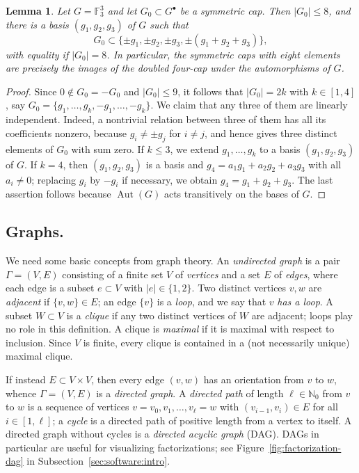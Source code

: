 \documentclass[a4paper, 10pt]{amsart}
\theoremstyle{plain}
\newtheorem{lemma}[theorem]{\bf Lemma}
\theoremstyle{definition}
\theoremstyle{definition}
\newcommand{\N}{\mathbb N}
\newcommand{\F}{\mathbb F}
\DeclareMathOperator{\Aut}{Aut} \DeclareMathOperator{\GL}{GL}
\numberwithin{equation}{section}
\begin{document}
\begin{lemma}\label{lem:symmetric-caps}
Let $G = \F_3^3$ and let $G_0 \subset G^{\bullet}$ be a symmetric cap.  Then
$|G_0| \le 8$, and there is a basis $(g_1,g_2,g_3)$ of $G$ such that
\[
 G_0 \subset \{\pm g_1, \pm g_2, \pm g_3, \pm (g_1+g_2+g_3)\} ,
\]
with equality if $|G_0| = 8$.  In particular, the symmetric caps with eight
elements are precisely the images of the doubled four-cap under the
automorphisms of $G$.
\end{lemma}

\begin{proof}
Since $0 \notin G_0 = -G_0$ and $|G_0| \le 9$, it follows  that $|G_0| = 2k$ with $k \in [1,4]$, say  $G_0=\{g_1, \ldots, g_k, -g_1, \ldots, -g_k\}$.  We claim that any three of them are
linearly independent. Indeed,  a nontrivial relation between three of them has all
its coefficients nonzero, because $g_i \ne \pm g_j$ for $i \ne j$, and hence
gives three distinct elements of $G_0$ with sum zero.  If $k \le 3$, we
extend $g_1, \ldots, g_k$ to a basis $(g_1,g_2,g_3)$ of $G$.  If $k = 4$, then
$(g_1,g_2,g_3)$ is a basis and $g_4 = a_1g_1+a_2g_2+a_3g_3$ with all
$a_i \ne 0$; replacing $g_i$ by $-g_i$ if necessary, we obtain
$g_4 = g_1+g_2+g_3$.  The last assertion follows because $\Aut (G)$ acts
transitively on the bases of $G$.
\end{proof}

\subsection{Graphs.} \label{sec:graphs}


We need some basic concepts from graph theory.
An \emph{undirected graph} is a pair $\Gamma = (V, E)$ consisting of a finite set $V$ of
\emph{vertices} and a set $E$ of \emph{edges}, where each edge is a subset
$e \subset V$ with $|e| \in \{1, 2\}$.  Two distinct vertices $v, w$ are
\emph{adjacent} if $\{v,w\} \in E$; an edge
$\{v\}$ is a \emph{loop}, and we say that $v$ \emph{has a loop}.
A subset $W \subset V$ is a \emph{clique} if any two distinct vertices of $W$
are adjacent; loops play no role in this definition.    A clique is \emph{maximal} if it is maximal with respect to
inclusion.  Since $V$ is finite, every clique is contained in a (not
necessarily unique) maximal clique.

If instead $E \subset V \times V$, then every edge $(v,w)$ has an
orientation from $v$ to $w$, whence $\Gamma = (V,E)$ is a \emph{directed graph}.
A \emph{directed path} of length $\ell \in \N_0$ from $v$ to $w$ is a sequence
of vertices $v = v_0, v_1, \ldots, v_\ell = w$ with $(v_{i-1}, v_i) \in E$ for
all $i \in [1,\ell]$; a \emph{cycle} is a directed path of positive length
from a vertex to itself.  A directed graph without cycles is a
\emph{directed acyclic graph} (DAG).  DAGs in particular are useful for
visualizing factorizations; see Figure~\ref{fig:factorization-dag} in
Subsection~\ref{sec:software:intro}.
\end{document}
